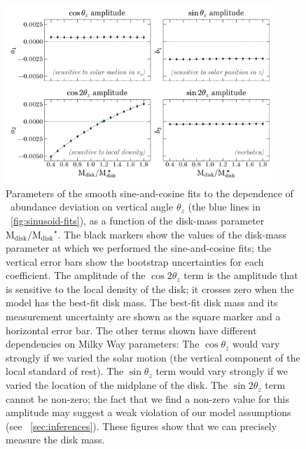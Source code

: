\documentclass[modern]{aastex63}
\newcommand{\mdisk}{\ensuremath{\mathrm{M}_\mathrm{disk}}}
\newcommand{\mratio}{\ensuremath{\mdisk / \mdisk^\star}}
\begin{document}
\begin{figure}[!tp] %
  \begin{mdframed}
    \color{captiongray}
  \begin{center}
  \includegraphics[width=0.9\textwidth]{coeff-vs-mdisk.pdf}
  \end{center}
  \caption{%
    Parameters of the smooth sine-and-cosine fits to the dependence of \mgfe\
    abundance deviation on vertical angle $\theta_z$ (the blue lines in
    \figurename~\ref{fig:sinusoid-fits}), as a function of the disk-mass
    parameter \mratio.
    The black markers show the values of the disk-mass parameter at which we
    performed the sine-and-cosine fits; the vertical error bars show the
    bootstrap uncertainties for each coefficient.
    The amplitude of the $\cos 2\theta_z$ term is the amplitude that is
    sensitive to the local density of the disk; it crosses zero when the model
    has the best-fit disk mass.
    The best-fit disk mass and its measurement uncertainty are shown as the
    square marker and a horizontal error bar.
    The other terms shown have different dependencies on Milky Way parameters:
    The $\cos\theta_z$ would vary strongly if we varied the solar motion (the
    vertical component of the local standard of rest).
    The $\sin\theta_z$ term would vary strongly if we varied the location of the
    midplane of the disk.
    The $\sin 2\theta_z$ term cannot be non-zero; the fact that we find a
    non-zero value for this amplitude may suggest a weak violation of our model
    assumptions (see \sectionname~\ref{sec:inferences}).
    These figures show that we can precisely measure the disk mass.
  \label{fig:coeff-mdisk}
  }
  \end{mdframed}
\end{figure}
\end{document}
